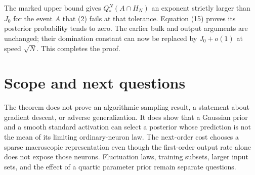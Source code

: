 \documentclass[11pt]{article}
\begin{document}
The marked upper bound gives $Q_*^N(A\cap H_N)$ an exponent strictly
larger than $J_0$ for the event $A$ that (2) fails at that tolerance.
Equation (15) proves its posterior probability tends to zero.
The earlier bulk and output arguments are unchanged; their domination
constant can now be replaced by $J_0+o(1)$ at speed $\sqrt N$.
This completes the proof.

\section{Scope and next questions}
The theorem does not prove an algorithmic sampling result, a statement
about gradient descent, or adverse generalization. It does show that
a Gaussian prior and a smooth standard activation can select a posterior
whose prediction is not the mean of its limiting ordinary-neuron law.
The next-order cost chooses a sparse macroscopic representation even
though the first-order output rate alone does not expose those neurons.
Fluctuation laws, training subsets, larger input sets, and the effect
of a quartic parameter prior remain separate questions.
\end{document}
